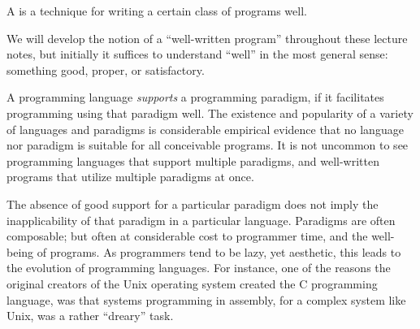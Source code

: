 \begin{definition}

A  is a technique for writing a certain class of
programs well.

\end{definition}

We will develop the notion of a ``well-written program'' throughout these
lecture notes, but initially it suffices to understand ``well'' in the most
general sense: something good, proper, or satisfactory.

A programming language \emph{supports} a programming paradigm, if it
facilitates programming using that paradigm well. The existence and popularity
of a variety of languages and paradigms is considerable empirical evidence that
no language nor paradigm is suitable for all conceivable programs. It is not
uncommon to see programming languages that support multiple paradigms, and
well-written programs that utilize multiple paradigms at once.

The absence of good support for a particular paradigm does not imply the
inapplicability of that paradigm in a particular language.  Paradigms are often
composable; but often at considerable cost to programmer time, and the
well-being of programs. As programmers tend to be lazy, yet aesthetic, this
leads to the evolution of programming languages. For instance, one of the
reasons the original creators of the Unix operating system created the C
programming language, was that systems programming in assembly, for a complex
system like Unix, was a rather ``dreary'' task\cite{the-development-of-c}.

